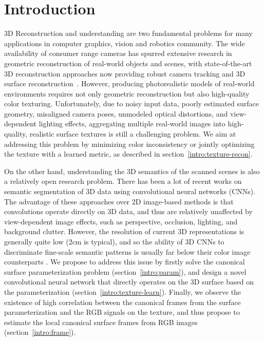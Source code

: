 \chapter{Introduction}
3D Reconstruction and understanding are two fundamental problems for many applications in computer graphics, vision and robotics community. The wide availability of consumer range cameras has spurred extensive research in geometric reconstruction of real-world objects and scenes, with state-of-the-art 3D reconstruction approaches now providing robust camera tracking and 3D surface reconstruction~\cite{newcombe2011kinectfusion,izadi2011kinectfusion,whelan2015elasticfusion,dai2017bundlefusion}. However, producing photorealistic models of real-world environments requires not only geometric reconstruction but also high-quality color texturing.
Unfortunately, due to noisy input data, poorly estimated surface geometry, misaligned camera poses, unmodeled optical distortions, and view-dependent lighting effects,  aggregating multiple real-world images into high-quality, realistic surface textures is still a challenging problem. We aim at addressing this problem by minimizing color inconsistency or jointly optimizing the texture with a learned metric, as described in section~\ref{intro:texture-recon}.

On the other hand, understanding the 3D semantics of the scanned scenes is also a relatively open research problem. There has been a lot of recent works on semantic segmentation of 3D data using convolutional neural networks (CNNs). The advantage of these approaches over 2D image-based methods is that convolutions operate directly on 3D data, and thus are relatively unaffected by view-dependent image effects, such as perspective, occlusion, lighting, and background clutter.   However, the resolution of current 3D representations is generally quite low (2cm is typical), and so the ability of 3D CNNs to discriminate fine-scale semantic patterns is usually far below their color image counterparts \cite{long2015fully,he2017mask}. We propose to address this issue by firstly solve the canonical surface parameterization problem (section~\ref{intro:param}), and design a novel convolutional neural network that directly operates on the 3D surface based on the parameterization (section~\ref{intro:texture-learn}). Finally, we observe the existence of high correlation between the canonical frames from the surface parameterization and the RGB signals on the texture, and thus propose to estimate the local canonical surface frames from RGB images (section~\ref{intro:frame}).


